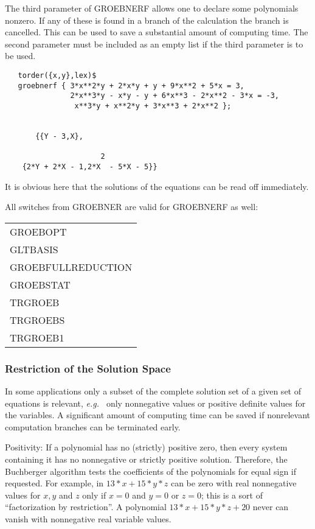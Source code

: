 The third parameter of GROEBNERF allows one to declare some polynomials
nonzero.  If any of these is found in a branch of the calculation
the branch is cancelled.  This can be used to save a substantial amount
of computing time.  The second parameter must be included as an
empty list if the third parameter is to be used.

\begin{verbatim}
   torder({x,y},lex)$
   groebnerf { 3*x**2*y + 2*x*y + y + 9*x**2 + 5*x = 3,
               2*x**3*y - x*y - y + 6*x**3 - 2*x**2 - 3*x = -3,
                x**3*y + x**2*y + 3*x**3 + 2*x**2 };


       {{Y - 3,X},

                      2
    {2*Y + 2*X - 1,2*X  - 5*X - 5}}
\end{verbatim}

It is obvious here that the solutions of the equations can be read
off immediately.

All switches from GROEBNER are valid for GROEBNERF as well:
 
\begin{center}
\begin{tabular}{l}
GROEBOPT \\
GLTBASIS \\
GROEBFULLREDUCTION \\
GROEBSTAT \\
TRGROEB \\
TRGROEBS \\
TRGROEB1
\end{tabular}
\end{center}

\subsubsection{Restriction of the Solution Space}
In some applications only a subset of the complete solution set
of a given set of equations is relevant, {\em e.g.\ }  only
nonnegative values or positive definite values for the variables.
A significant amount of computing time can be saved if
nonrelevant computation branches can be terminated early.

Positivity: If a polynomial has no (strictly) positive zero, then
every system containing it has no nonnegative or strictly positive
solution.  Therefore, the Buchberger algorithm tests the coefficients of
the polynomials for equal sign if requested.  For example, in $13*x +
15*y*z $ can be zero with real nonnegative values for $x, y$ and $z$
only if $x=0$ and $y=0$ or $ z=0$; this is a sort of ``factorization by
restriction''.  A polynomial $13*x + 15*y*z + 20$ never can vanish
with nonnegative real variable values.

